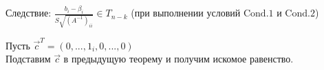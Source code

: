 Следствие: $\frac{b_i - \beta_i}{S\sqrt{(A^{-1})_{ii}}} \in T_{n - k}$ (при выполнении условий $\mathrm{Cond. 1}$ и $\mathrm{Cond. 2}$) \hfill \TagYTwoEight \\

\begin{MyProof}
    Пусть $\vec{c}^T = (0, ..., 1_i, 0, ..., 0)$ \\
    Подставим $\vec c$ в предыдущую теорему и получим искомое равенство.
\end{MyProof}

%


